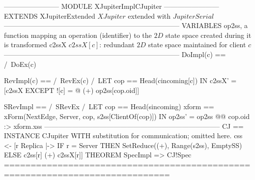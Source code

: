 \documentclass{article}
\begin{document}
\begin{tla}
------------------------ MODULE XJupiterImplCJupiter ------------------------
EXTENDS XJupiterExtended \* $XJupiter$ extended with $JupiterSerial$
-----------------------------------------------------------------------------
VARIABLES op2ss,  \* a function mapping an operation (identifier)
                  \* to the $2D$ state space created during it is transformed
          c2ssX   \* $c2ssX[c]$: redundant $2D$ state space maintained for client $c$
-----------------------------------------------------------------------------
DoImpl(c) == /\ DoEx(c)

RevImpl(c) ==
    /\ RevEx(c)
    /\ LET cop == Head(cincoming[c])
       IN  c2ssX' = [c2ssX EXCEPT ![c] = @ (+) op2ss[cop.oid]]

SRevImpl == 
    /\ SRevEx
    /\ LET cop == Head(sincoming)
         xform == xForm(NextEdge, Server, cop, s2ss[ClientOf(cop)])
       IN op2ss' = op2ss @@ cop.oid :> xform.xss
-----------------------------------------------------------------------------
CJ == INSTANCE CJupiter WITH \* substitution for communication; omitted here.
         css <- [r \in Replica |-> IF r = Server 
                                   THEN SetReduce((+), Range(s2ss), EmptySS)
                                   ELSE c2ss[r] (+) c2ssX[r]]
THEOREM SpecImpl => CJ!Spec
=============================================================================
\end{tla}
\end{document}
